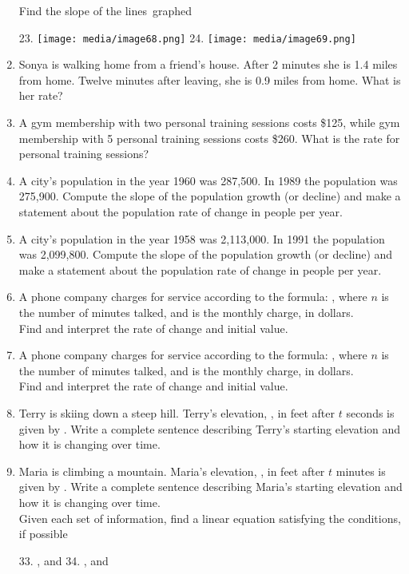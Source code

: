 \begin{enumerate}
Find the slope of the lines~graphed

23.
\texttt{[image: media/image68.png]}
24.
\texttt{[image: media/image69.png]}


\item
  Sonya is walking home from a friend's house. After 2 minutes she is
  1.4 miles from home. Twelve minutes after leaving, she is 0.9 miles
  from home. What is her rate?
\item
  A gym membership with two personal training sessions costs \$125,
  while gym membership with 5 personal training sessions costs \$260.
  What is the rate for personal training sessions?
\item
  A city's population in the year 1960 was 287,500. In 1989 the
  population was 275,900. Compute the slope of the population growth (or
  decline) and make a statement about the population rate of change in
  people per year.
\item
  A city's population in the year 1958 was 2,113,000. In 1991 the
  population was 2,099,800. Compute the slope of the population growth
  (or decline) and make a statement about the population rate of change
  in people per year.
\item
  A phone company charges for service according to the formula: , where
  $n$ is the number of minutes talked, and is the monthly charge,
  in dollars.\\
  Find and interpret the rate of change and initial value.
\item
  A phone company charges for service according to the formula: , where
  $n$ is the number of minutes talked, and is the monthly charge,
  in dollars.\\
  Find and interpret the rate of change and initial value.
\item
  Terry is skiing down a steep hill. Terry's elevation, , in feet after
  $t$ seconds is given by . Write a complete sentence describing
  Terry's starting elevation and how it is changing over time.
\item
  Maria is climbing a mountain. Maria's elevation, , in feet after
  $t$ minutes is given by . Write a complete sentence describing
  Maria's starting elevation and how it is changing over time.\\

Given each set of information, find a linear equation satisfying the
conditions, if possible

33. , and 34. , and


\end{enumerate}
